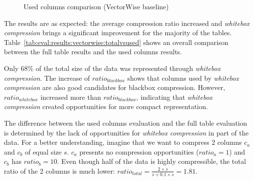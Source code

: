 \begin{figure}[h]
  \centering
  \caption{Used columns comparison (VectorWise baseline)}
  \label{fig:eval:results:vectorwise:used}
\end{figure}

The results are as expected: the average compression ratio increased and \textit{whitebox compression} brings a significant improvement for the majority of the tables. Table~\ref{tab:eval:results:vectorwise:totalvsused} shows an overall comparison between the full table results and the used columns results.



Only 68\% of the total size of the data was represented through \textit{whitebox compression}. The increase of \(ratio_{blackbox}\) shows that columns used by \textit{whitebox compression} are also good candidates for  blackbox compression. However, \(ratio_{whitebox}\) increased more than \(ratio_{blackbox}\), indicating that \textit{whitebox compression} created opportunities for more compact representation.

The difference between the used columns evaluation and the full table evaluation is determined by the lack of opportunities for \textit{whitebox compression} in part of the data. For a better understanding, imagine that we want to compress 2 columns \(c_{a}\) and \(c_{b}\) of equal size \(s\). \(c_{a}\) presents no compression opportunities (\(ratio_{a} = 1\)) and \(c_{b}\) has \(ratio_{b} = 10\). Even though half of the data is highly compressible, the total ratio of the 2 columns is much lower: \(ratio_{total} = \frac{2 \times s}{s + 0.1 \times s} = 1.81\).

